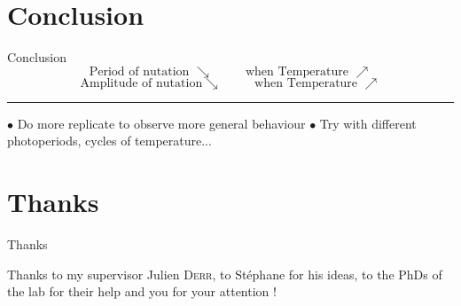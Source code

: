 \documentclass[12pt]{beamer}
\begin{document}
\section{Conclusion}
\begin{frame}{Conclusion}
\vfill
\[ \text{Period of nutation } \searrow \text{~~~~~~~~when Temperature } \nearrow \]
\vfill
\[  \text{Amplitude of nutation} \searrow \text{~~~~~~~~when Temperature } \nearrow\]
\vfill
\hrule
\vfill
$\bullet$ Do more replicate to observe more general behaviour
\vfill
$\bullet$ Try with different photoperiods, cycles of temperature...

\end{frame}

\section{Thanks}
\begin{frame}{Thanks}
\begin{center}
\vfill
Thanks to my supervisor Julien \textsc{Derr},
\vfill
to Stéphane for his ideas,
\vfill
to the PhDs of the lab for their help
\vfill
and you for your attention !
\vfill
\end{center}
\end{frame}
\end{document}

